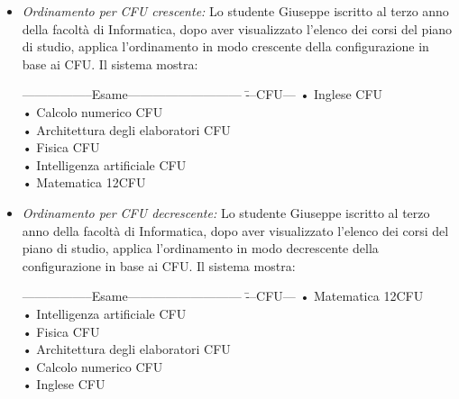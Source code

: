 \begin{itemize}
	\item \textit{Ordinamento per CFU crescente:}
	Lo studente Giuseppe iscritto al terzo anno della facoltà di Informatica, dopo aver visualizzato l'elenco dei corsi del piano di studio, applica l'ordinamento in modo crescente della configurazione in base ai CFU. Il sistema mostra:
	\begin{tabbing}
		\hspace{1cm}-----------------Esame--------------------------- \= ---CFU--- \kill
		\hspace{1cm} • Inglese  CFU\\
		\hspace{1cm} • Calcolo numerico   CFU\\
		\hspace{1cm} • Architettura degli elaboratori  CFU\\
		\hspace{1cm} • Fisica  CFU\\
		\hspace{1cm} • Intelligenza artificiale  CFU\\
		\hspace{1cm} • Matematica \> 12CFU\\
	\end{tabbing}
	
	\item \textit{Ordinamento per CFU decrescente:}
	Lo studente Giuseppe iscritto al terzo anno della facoltà di Informatica, dopo aver visualizzato l'elenco dei corsi del piano di studio, applica l'ordinamento in modo decrescente della configurazione in base ai CFU. Il sistema mostra:
	\begin{tabbing}
		\hspace{1cm}-----------------Esame--------------------------- \= ---CFU--- \kill
		\hspace{1cm} • Matematica \> 12CFU\\
		\hspace{1cm} • Intelligenza artificiale  CFU\\
		\hspace{1cm} • Fisica  CFU\\
		\hspace{1cm} • Architettura degli elaboratori  CFU\\
		\hspace{1cm} • Calcolo numerico   CFU\\
		\hspace{1cm} • Inglese  CFU\\
	\end{tabbing}
	

\end{itemize}
